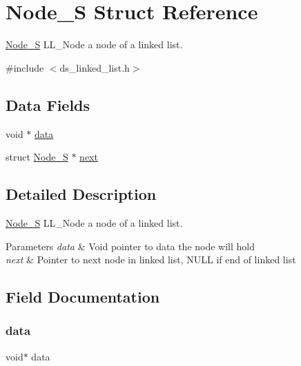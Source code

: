 \hypertarget{struct_node___s}{}\section{Node\+\_\+S Struct Reference}
\label{struct_node___s}


\hyperlink{struct_node___s}{Node\+\_\+S} L\+L\+\_\+\+Node a node of a linked list.  




{\ttfamily \#include $<$ds\+\_\+linked\+\_\+list.\+h$>$}

\subsection*{Data Fields}
\begin{DoxyCompactItemize}
\item 
void $\ast$ \hyperlink{struct_node___s_a735984d41155bc1032e09bece8f8d66d}{data}
\item 
struct \hyperlink{struct_node___s}{Node\+\_\+S} $\ast$ \hyperlink{struct_node___s_aa06ac35a70bd6374c9178f1bce8d5368}{next}
\end{DoxyCompactItemize}


\subsection{Detailed Description}
\hyperlink{struct_node___s}{Node\+\_\+S} L\+L\+\_\+\+Node a node of a linked list. 


\begin{DoxyParams}{Parameters}
{\em data} & Void pointer to data the node will hold \\
\hline
{\em next} & Pointer to next node in linked list, N\+U\+LL if end of linked list \\
\hline
\end{DoxyParams}


\subsection{Field Documentation}
\mbox{\label{struct_node___s_a735984d41155bc1032e09bece8f8d66d}} 
\subsubsection{\texorpdfstring{data}{data}}
{\footnotesize\ttfamily void$\ast$ data}

